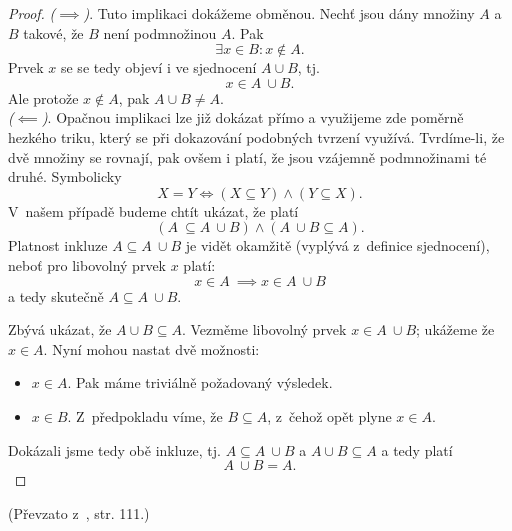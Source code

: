 \begin{proof}
    \textit{($\implies$)}. Tuto implikaci dokážeme obměnou. Nechť jsou dány množiny $A$ a $B$ takové, že $B$ není podmnožinou $A$. Pak
    \begin{equation*}
        \exists x\in B : x\notin A.
    \end{equation*}
    Prvek $x$ se se tedy objeví i ve sjednocení $A \cup B$, tj.
    \begin{equation*}
        x\in A~\cup B.
    \end{equation*}
    Ale protože $x\notin A$, pak $A \cup B \neq A$.\\
    \textit{($\impliedby$)}. Opačnou implikaci lze již dokázat přímo a využijeme zde poměrně hezkého triku, který se při dokazování podobných tvrzení využívá. Tvrdíme-li, že dvě množiny se rovnají, pak ovšem i platí, že jsou vzájemně podmnožinami té druhé. Symbolicky
    \begin{equation*}
        X = Y \iff (X \subseteq Y) \land (Y \subseteq X).
    \end{equation*}
    V~našem případě budeme chtít ukázat, že platí
    \begin{equation*}
        (A~\subseteq A~\cup B) \land (A~\cup B \subseteq A).
    \end{equation*}
    Platnost inkluze $A \subseteq A~\cup B$ je vidět okamžitě (vyplývá z~definice sjednocení), neboť pro libovolný prvek $x$ platí:
    \begin{equation*}
        x \in A~\implies x \in A~\cup B
    \end{equation*}
    a tedy skutečně $A \subseteq A~\cup B$.\par
    Zbývá ukázat, že $A \cup B \subseteq A$. Vezměme libovolný prvek $x \in A~\cup B$; ukážeme že $x\in A$. Nyní mohou nastat dvě možnosti:
    \begin{itemize}
        \item $x \in A$. Pak máme triviálně požadovaný výsledek.
        \item $x \in B$. Z~předpokladu víme, že $B \subseteq A$, z~čehož opět plyne $x\in A$.
    \end{itemize}
    Dokázali jsme tedy obě inkluze, tj. $A \subseteq A~\cup B$ a $A \cup B \subseteq A$ a tedy platí
    \begin{equation*}
        A~\cup B = A.
    \end{equation*}
\end{proof}
(Převzato z~\cite{ChartrandPolimeniZhang2014}, str. 111.)
